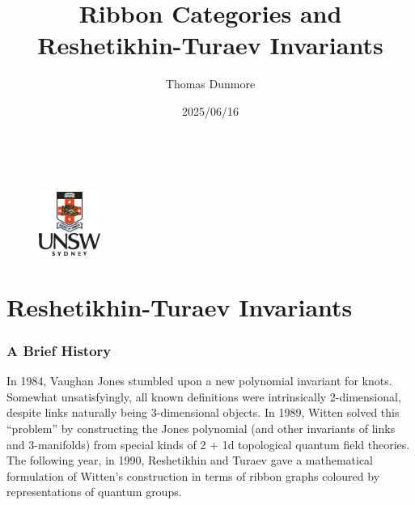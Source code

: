 \documentclass{beamer}
\title[Ribbon Categories and RT Invariants]{Ribbon Categories and Reshetikhin-Turaev Invariants}%
\author[Thomas Dunmore]{Thomas Dunmore}
\institute[UNSW]{
	University of New South Wales \\
	\medskip
	\textit{t.dunmore@unsw.edu.au}
}
\date{2025/06/16}
\begin{document}

\begin{frame}
\titlepage
\noindent\\[-15pt]
\begin{figure}[!ht]
\hspace{3.5cm}\hfill\includegraphics[width=2cm]{unsw-crest}\hfill{}
\end{figure}
\end{frame}



\section{Reshetikhin-Turaev Invariants}


\begin{frame}
\frametitle{A Brief History}
In 1984, Vaughan Jones stumbled upon a new polynomial invariant for knots. Somewhat unsatisfyingly, all known definitions were intrinsically 2-dimensional, despite links naturally being 3-dimensional objects.
\newline\newline
In 1989, Witten solved this ``problem'' by constructing the Jones polynomial (and other invariants of links and 3-manifolds) from special kinds of 2 + 1d topological quantum field theories.
\newline\newline
The following year, in 1990, Reshetikhin and Turaev gave a mathematical formulation of Witten's construction in terms of ribbon graphs coloured by representations of quantum groups.
\end{frame}
\end{document}

